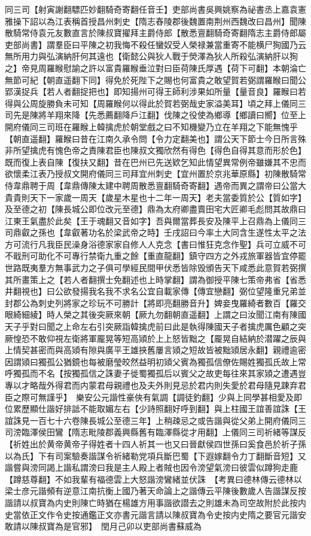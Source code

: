 同三司【射寅謝翻驃匹妙翻騎奇寄翻任音壬】吏部尚書吳興姚察為祕書丞上嘉袁憲雅操下詔以為江表稱首授昌州刺史【隋志舂陵郡後魏置南荆州西魏改曰昌州】聞陳散騎常侍袁元友數直言於陳叔寶擢拜主爵侍郎【散悉亶翻騎奇寄翻隋志主爵侍郎屬吏部尚書】謂羣臣曰平陳之初我悔不殺任蠻奴受人榮禄兼當重寄不能横尸狥國乃云無所用力與弘演納肝何其遠也【衛懿公與狄人戰于熒澤為狄人所殺弘演納肝以狥之】帝見周羅睺慰諭之許以富貴羅睺垂泣對曰臣荷陳氏厚遇【荷下可翻】本朝淪亡無節可紀【朝直遥翻下同】得免於死陛下之賜也何富貴之敢望賀若弼謂羅睺曰聞公郢漢捉兵【若人者翻捉把也】即知揚州可得王師利涉果如所量【量音良】羅睺曰若得與公周旋勝負未可知【周羅睺何以得此於賀若弼哉史家溢美耳】頃之拜上儀同三司先是陳將羊翔來降【先悉薦翻降戶江翻】伐陳之役使為鄉導【鄉讀曰嚮】位至上開府儀同三司班在羅睺上韓擒虎於朝堂戲之曰不知機變乃立在羊翔之下能無愧乎【朝直遥翻】羅睺曰昔在江南久承令問【令力定翻美也】謂公天下節士今日所言殊非所望擒虎有愧色帝之責陳君臣也陳叔文獨欣然有得色【得色自得其意而形於色】既而復上表自陳【復扶又翻】昔在巴州已先送欵乞知此情望異常例帝雖嫌其不忠而欲懷柔江表乃授叔文開府儀同三司拜宜州刺史【宜州置於京兆華原縣】初陳散騎常侍韋鼎聘于周【韋鼎傳陳太建中聘周散悉亶翻騎奇寄翻】遇帝而異之謂帝曰公當大貴貴則天下一家歲一周天【歲星木星也十二年一周天】老夫當委質於公【質如字】及至德之初【陳長城公即位改元至德】鼎為太府卿盡賣田宅大匠卿毛彪問其故鼎曰江東王氣盡於此矣【王于魂翻又音如字】吾與爾當葬長安及陳平上召鼎為上儀同三司鼎叡之孫也【韋叡著功名於梁武帝之時】壬戌詔曰今率土大同含生遂性太平之法方可流行凡我臣民澡身浴德家家自修人人克念【書曰惟狂克念作聖】兵可立威不可不戢刑可助化不可專行禁衛九重之餘【重直龍翻】鎮守四方之外戎旅軍器皆宜停罷世路既夷羣方無事武力之子俱可學經民間甲伏悉皆除毁頒告天下咸悉此意賀若弼撰其所畫策上之【若人者翻撰士免翻述也上時掌翻】謂為御授平陳七策帝弗省【省悉井翻視也】曰公欲發揚我名我不求名公宜自載家傳【傳宜戀翻】弼位望隆重兄弟並封郡公為刺史列將家之珍玩不可勝計【將即亮翻勝音升】婢妾曳羅綺者數百【羅交眼綺細綾】時人榮之其後突厥來朝【厥九勿翻朝直遥翻】上謂之曰汝聞江南有陳國天子乎對曰聞之上命左右引突厥詣韓擒虎前曰此是執得陳國天子者擒虎厲色顧之突厥惶恐不敢仰視左衛將軍龎晃等短高熲於上上怒皆黜之【龎晃自結納於潜躍之辰與上情契甚密而與高熲有隙與廣平王雄挾舊屢言熲之短故皆被黜熲居永翻】親禮逾密因謂熲曰獨孤公猶鏡也每被磨瑩皎然益明初熲父賓為獨孤信僚佐賜姓獨孤氏故上常呼獨孤而不名【按獨孤信之誅妻子徙蜀獨孤后以賓父之故吏每往來其家熲之遭遇豈專以才略哉外得君而内蒙君母親禮也及夫外則見忌於君内則失愛於君母隨見踈弃君臣之際可無謹乎】　樂安公元諧性豪俠有氣調【調徒釣翻】少與上同學甚相愛及即位累歷顯仕諧好排詆不能取媚左右【少詩照翻好呼到翻】與上柱國王誼善誼誅【王誼誅見一百七十六卷陳長城公至德三年】上稍疎忌之或告諧與從父弟上開府儀同三司滂臨澤侯田鸞【隋志毗陵郡義興縣舊有臨澤縣從才用翻】上儀同三司祈緒等謀反【祈姓出於黄帝黄帝子得姓者十四人祈其一也又曰晉獻侯四世孫曰奚食邑於祈子孫以為氏】下有司案驗奏諧謀令祈緒勒党項兵斷巴蜀【下遐嫁翻令力丁翻斷音短】又諧嘗與滂同謁上諧私謂滂曰我是主人殿上者賊也因令滂望氣滂曰彼雲似蹲狗走鹿【蹲慈尊翻】不如我輩有福德雲上大怒諧滂鸞緒並伏誅　【考異曰德林傳云德林以梁士彦元諧頻有逆意江南抗衡上國乃著天命論上之諧傳云平陳後數歲人告諧謀反按諧請以叔寶為内史則陳亡時猶在楊雄方用事諧欲譛去之則雄未為司空故附於此按内史當依正文作令史按通鑑正文亦書元諧言請以陳叔寶為令史按内史隋之要官元諧安敢請以陳叔寶為是官邪】　閏月己卯以吏部尚書蘇威為